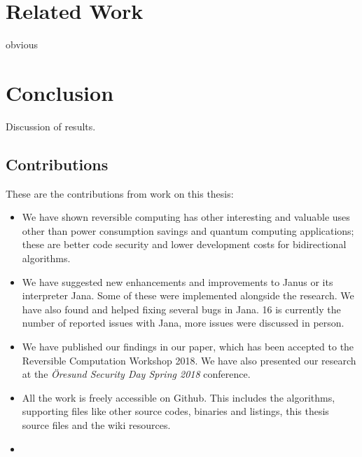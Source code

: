 \documentclass[a4paper,10pt,openright]{memoir}
\newcommand{\term}[1]{\textit{#1}}
\begin{document}

\chapter{Related Work}

obvious

\chapter{Conclusion}

Discussion of results.

\section{Contributions}

These are the contributions from work on this thesis:

\begin{itemize}

\item We have shown reversible computing has other interesting and 
valuable uses other than power consumption savings and quantum 
computing applications; these are better code security and lower 
development costs for bidirectional algorithms.

\item We have suggested new enhancements and improvements to Janus or 
its interpreter Jana. Some of these were implemented alongside the 
research. We have also found and helped fixing several bugs in Jana. 16 
is currently the number of reported issues with Jana, more issues were 
discussed in person.

\item We have published our findings in our paper\cite{revcry-paper}, which 
has been accepted to the Reversible Computation Workshop 2018. We have 
also presented our research at the \term{Öresund Security Day Spring 
2018} conference.

\item All the work is freely accessible on 
Github\cite{revcry-github}. This includes the algorithms, 
supporting files like other source codes, binaries and listings, this 
thesis source files and the wiki resources.

\item {}

\end{itemize}
\end{document}

